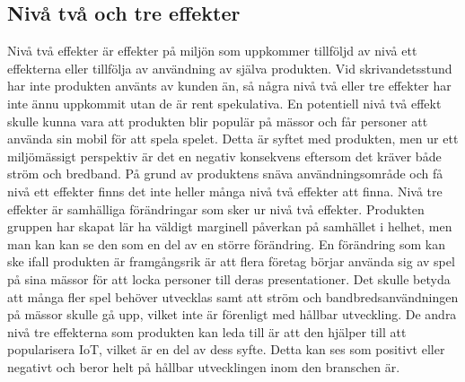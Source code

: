 \subsection{Nivå två och tre effekter}
Nivå två effekter är effekter på miljön som uppkommer tillföljd av nivå ett effekterna eller tillfölja av användning av själva produkten. Vid skrivandetsstund har inte produkten använts av kunden än, så några nivå två eller tre effekter har inte ännu uppkommit utan de är rent spekulativa. En potentiell nivå två effekt skulle kunna vara att produkten blir populär på mässor och får personer att använda sin mobil för att spela spelet. Detta är syftet med produkten, men ur ett miljömässigt perspektiv är det en negativ konsekvens eftersom det kräver både ström och bredband. På grund av produktens snäva användningsområde och få nivå ett effekter finns det inte heller många nivå två effekter att finna. Nivå tre effekter är samhälliga förändringar som sker ur nivå två effekter. Produkten gruppen har skapat lär ha väldigt marginell påverkan på samhället i helhet, men man kan kan se den som en del av en större förändring. En förändring som kan ske ifall produkten är framgångsrik är att flera företag börjar använda sig av spel på sina mässor för att locka personer till deras presentationer. Det skulle betyda att många fler spel behöver utvecklas samt att ström och bandbredsanvändningen på mässor skulle gå upp, vilket inte är förenligt med hållbar utveckling. De andra nivå tre effekterna som produkten kan leda till är att den hjälper till att popularisera IoT, vilket är en del av dess syfte. Detta kan ses som positivt eller negativt och beror helt på hållbar utvecklingen inom den branschen är. 
